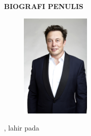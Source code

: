 \begin{center}
  \Large
  \textbf{BIOGRAFI PENULIS}
\end{center}


\vspace{2ex}

\begin{figure}
  \centering
  \vspace{-3ex}
  \includegraphics[width=0.3\textwidth]{figures/elon.jpg}
  \vspace{-4ex}
\end{figure}

\name{}, lahir pada \lipsum[1]

\lipsum[2]
